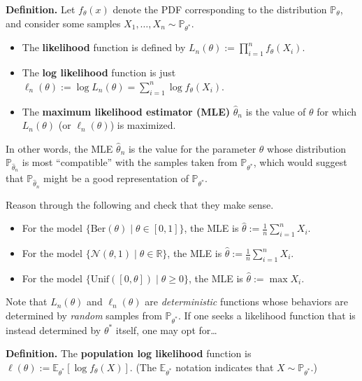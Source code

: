 \textbf{Definition.} Let $f_{\theta}(x)$ denote the PDF corresponding to
the distribution $\mathbb{P}_{\theta}$, and
consider some samples $X_1, \dots, X_n \sim \mathbb{P}_{\theta^*}$.
\begin{itemize}
    \item The \textbf{likelihood} function is defined by
    $L_n(\theta) := \prod_{i = 1}^n f_{\theta}(X_i)$.
    \item The \textbf{log likelihood} function is just $\ell_n(\theta) := \log L_n(\theta)
    = \sum_{i = 1}^n \log f_{\theta}(X_i)$.
    \item The \textbf{maximum likelihood estimator (MLE)} $\hat{\theta}_n$ is the value
    of $\theta$ for which $L_n(\theta)$ (or $\ell_n(\theta)$) is maximized.
\end{itemize}
In other words, the MLE $\hat{\theta}_n$
is the value for the parameter $\theta$ whose distribution $\mathbb{P}_{\hat{\theta}_n}$
is most ``compatible'' with the samples taken from $\mathbb{P}_{\theta^*}$,
which would suggest that $\mathbb{P}_{\hat{\theta}_n}$
might be a good representation of $\mathbb{P}_{\theta^*}$.

\begin{remark}
    Reason through the following and check that they make sense.
    \begin{itemize}
        \item For the model $\{\mathrm{Ber}(\theta) \mid \theta \in [0, 1]\}$,
        the MLE is $\hat{\theta} := \frac{1}{n} \sum_{i = 1}^n X_i$.
        \item For the model $\{\mathcal{N}(\theta, 1) \mid \theta \in \mathbb{R}\}$,
        the MLE is $\hat{\theta} := \frac{1}{n} \sum_{i = 1}^n X_i$.
        \item For the model $\{\mathrm{Unif}([0, \theta]) \mid \theta \geq 0\}$,
        the MLE is $\hat{\theta} := \max X_i$.
    \end{itemize}
\end{remark}

Note that $L_n(\theta)$ and $\ell_n(\theta)$ are
\emph{deterministic} functions whose behaviors are determined by \emph{random} samples
from $\mathbb{P}_{\theta^*}$.
If one seeks a likelihood function that is instead determined by $\theta^*$ itself,
one may opt for\dots

\textbf{Definition.} The \textbf{population log likelihood} function is 
 $\ell(\theta) := \mathbb{E}_{\theta^*}[\log f_{\theta}(X)]$.
(The $\mathbb{E}_{\theta^*}$ notation
indicates that $X \sim \mathbb{P}_{\theta^*}$.)


